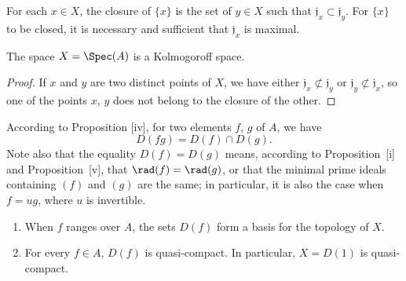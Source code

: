 \begin{corollary}[1.1.7]
\label{I.1.1.7}
For each $x\in X$, the closure of $\{x\}$ is the set of $y\in X$ such that $\mathfrak{j}_x\subset\mathfrak{j}_y$.
For $\{x\}$ to be closed, it is necessary and sufficient that $\mathfrak{j}_x$ is maximal.
\end{corollary}

\begin{corollary}[1.1.8]
\label{I.1.1.8}
The space $X=\Spec(A)$ is a Kolmogoroff space.
\end{corollary}

\begin{proof}
If $x$ and $y$ are two distinct points of $X$, we have either $\mathfrak{j}_x\not\subset\mathfrak{j}_y$ or $\mathfrak{j}_y\not\subset\mathfrak{j}_x$, so one of the points $x$, $y$ does not belong to the closure of the other.
\end{proof}

\begin{env}[1.1.9]
\label{I.1.1.9}
According to Proposition [iv], for two elements $f$, $g$ of $A$, we have
\[
\label{I.1.1.9.1}
  D(fg)=D(f)\cap D(g).
  \tag{1.1.9.1}
\]
Note also that the equality $D(f)=D(g)$ means, according to Proposition~[i] and Proposition~[v], that $\rad(f)=\rad(g)$, or that the minimal prime ideals containing $(f)$ and $(g)$ are the same;
in particular, it is also the case when $f=ug$, where $u$ is invertible.
\end{env}

\begin{proposition}[1.1.10]
\label{I.1.1.10}
\medskip\noindent
{}
\begin{enumerate}
  \item[{\rm(i)}] When $f$ ranges over $A$, the sets $D(f)$ form a basis for the topology of $X$.
  \item[{\rm(ii)}] For every $f\in A$, $D(f)$ is quasi-compact.
    In particular, $X=D(1)$ is quasi-compact.
\end{enumerate}
\end{proposition}

